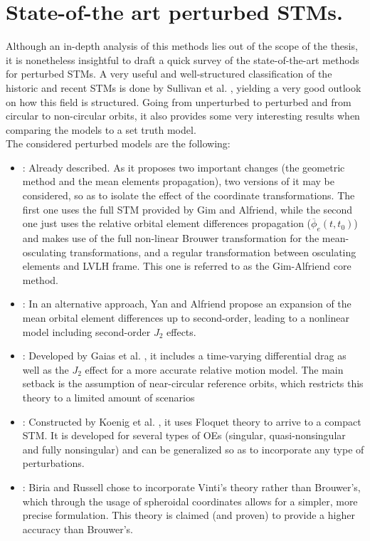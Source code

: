 \section{State-of-the art perturbed STMs.}
%
\indent Although an in-depth analysis of this methods lies out of the scope of the thesis, it is nonetheless insightful to draft a quick survey of the state-of-the-art methods for perturbed STMs. A very useful and well-structured classification of the historic and recent STMs is done by Sullivan et al. \cite{Sullivan}, yielding a very good outlook on how this field is structured. Going from unperturbed to perturbed and from circular to non-circular orbits, it also provides some very interesting results when comparing the models to a set truth model.\\
%
\indent The considered perturbed models are the following:
%
\begin{itemize}
\item[\GMVred{I.}] : Already described. As it proposes two important changes (the geometric method and the mean elements propagation), two versions of it may be considered, so as to isolate the effect of the coordinate transformations. The first one uses the full STM provided by Gim and Alfriend, while the second one just uses the relative orbital element differences propagation (\ie $\overline{\phi}_e(t, t_0)$) and makes use of the full non-linear Brouwer transformation for the mean-osculating transformations, and a regular transformation between osculating elements and LVLH frame. This one is referred to as the Gim-Alfriend core method.
%
\item[\GMVred{II.}] : In an alternative approach, Yan and Alfriend \cite{Yan_Alfriend} propose an expansion of the mean orbital element differences up to second-order, leading to a nonlinear model including second-order $J_2$ effects.
%
\item[\GMVred{III.}] : Developed by Gaias et al. \cite{GAM}, it includes a time-varying differential drag as well as the $J_2$ effect for a more accurate relative motion model. The main setback is the assumption of near-circular reference orbits, which restricts this theory to a limited amount of scenarios
%
\item[\GMVred{IV.}] : Constructed by Koenig et al. \cite{Koenig}, it uses Floquet theory to arrive to a compact STM. It is developed for several types of OEs (singular, quasi-nonsingular and fully nonsingular) and can be generalized so as to incorporate any type of perturbations.
%
\item[\GMVred{V.}] : Biria and Russell chose to incorporate Vinti's theory rather than Brouwer's, which through the usage of spheroidal coordinates allows for a simpler, more precise formulation. This theory is claimed (and proven) to provide a higher accuracy than Brouwer's.
%
\end{itemize} 
